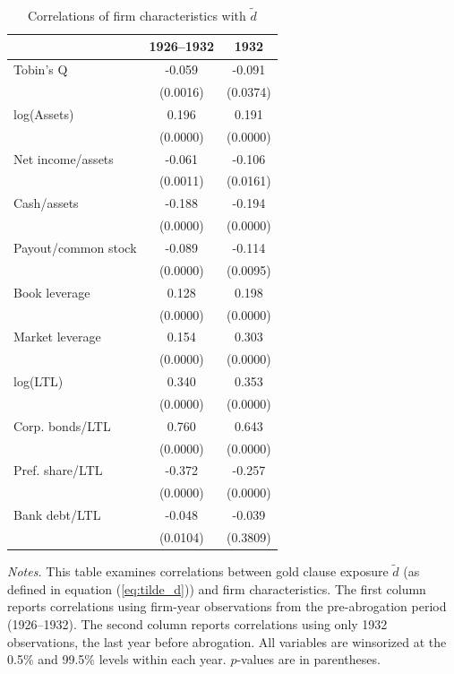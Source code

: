 \begin{table}[p]\centering
\caption{\\ Correlations of firm characteristics with $\tilde{d}$}
\label{tabapp:correlation} \scriptsize
\renewcommand{\arraystretch}{1.2}
    \begin{threeparttable}
        \begin{tabular}{lcc}
            \toprule
            & 1926--1932 & 1932 \\
            \midrule
            Tobin's Q & -0.059 & -0.091 \\
            & (0.0016) & (0.0374) \\
            log(Assets) & 0.196 & 0.191 \\
            & (0.0000) & (0.0000) \\
            Net income/assets & -0.061 & -0.106 \\
            & (0.0011) & (0.0161) \\
            Cash/assets & -0.188 & -0.194 \\
            & (0.0000) & (0.0000) \\
            Payout/common stock & -0.089 & -0.114 \\
            & (0.0000) & (0.0095) \\
            Book leverage & 0.128 & 0.198 \\
            & (0.0000) & (0.0000) \\
            Market leverage & 0.154 & 0.303 \\
            & (0.0000) & (0.0000) \\
            log(LTL) & 0.340 & 0.353 \\
            & (0.0000) & (0.0000) \\
            Corp. bonds/LTL & 0.760 & 0.643 \\
            & (0.0000) & (0.0000) \\
            Pref. share/LTL & -0.372 & -0.257 \\
            & (0.0000) & (0.0000) \\
            Bank debt/LTL & -0.048 & -0.039 \\
            & (0.0104) & (0.3809) \\
            \bottomrule
        \end{tabular}
    \end{threeparttable}

\vspace*{3mm} \justifying \noindent
\footnotesize{\textit{Notes.} This table examines correlations between gold clause exposure $\tilde{d}$ (as defined in equation (\ref{eq:tilde_d})) and firm characteristics. The first column reports correlations using firm-year observations from the pre-abrogation period (1926--1932). The second column reports correlations using only 1932 observations, the last year before abrogation. All variables are winsorized at the 0.5\% and 99.5\% levels within each year. $p$-values are in parentheses.}
\end{table}